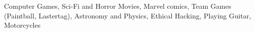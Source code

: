 
\begin{cvparagraph}
  {Computer Games, Sci-Fi and Horror Movies, Marvel comics, Team Games (Paintball, Lastertag), Astronomy and Physics, Ethical Hacking, Playing Guitar, Motorcycles}
\end{cvparagraph}

